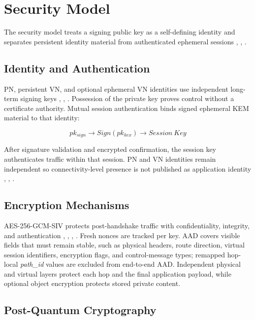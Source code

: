 \documentclass[
  12pt,
  oneside,
  a4paper,
  chapter=TITLE,
  section=TITLE,
  english,
  brazil
]{abntex2}
\begin{document}
\section{Security Model}

The security model treats a signing public key as a self-defining identity and separates persistent identity material from authenticated ephemeral sessions \cite{mirzaei2018pk}, \cite{bos2017kyber}, \cite{nist2024fips203}.

\subsection{Identity and Authentication}

PN, persistent VN, and optional ephemeral VN identities use independent long-term signing keys \cite{li2022unreachable}, \cite{mirzaei2018pk}, \cite{qian2016garlic}. Possession of the private key proves control without a certificate authority. Mutual session authentication binds signed ephemeral KEM material to that identity:

\[
pk_{sign} \rightarrow Sign(pk_{kex}) \rightarrow Session\ Key
\]

After signature validation and encrypted confirmation, the session key authenticates traffic within that session. PN and VN identities remain independent so connectivity-level presence is not published as application identity \cite{li2022unreachable}, \cite{mirzaei2018pk}, \cite{qian2016garlic}.

\subsection{Encryption Mechanisms}

AES-256-GCM-SIV protects post-handshake traffic with confidentiality, integrity, and authentication \cite{mirzaei2018pk}, \cite{bos2017kyber}, \cite{nist2024fips203}, \cite{rfc8452}. Fresh nonces are tracked per key. AAD covers visible fields that must remain stable, such as physical headers, route direction, virtual session identifiers, encryption flags, and control-message types; remapped hop-local \textit{path\_id} values are excluded from end-to-end AAD. Independent physical and virtual layers protect each hop and the final application payload, while optional object encryption protects stored private content.

\subsection{Post-Quantum Cryptography}
\end{document}
